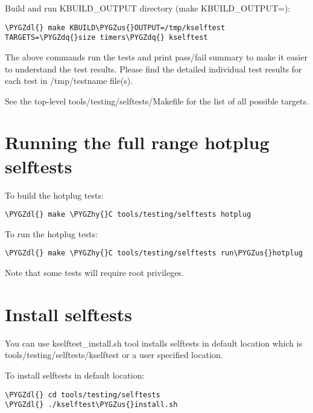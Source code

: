 \documentclass[a4paper,8pt,english]{sphinxmanual}
\def\PYGZus{\char`\_}
\def\PYGZdl{\char`\$}
\def\PYGZhy{\char`\-}
\def\PYGZdq{\char`\"}
\begin{document}
Build and run KBUILD\_OUTPUT directory (make KBUILD\_OUTPUT=):

\begin{Verbatim}[commandchars=\\\{\}]
\PYGZdl{} make KBUILD\PYGZus{}OUTPUT=/tmp/kselftest TARGETS=\PYGZdq{}size timers\PYGZdq{} kselftest
\end{Verbatim}

The above commands run the tests and print pass/fail summary to make it
easier to understand the test results. Please find the detailed individual
test results for each test in /tmp/testname file(s).

See the top-level tools/testing/selftests/Makefile for the list of all
possible targets.


\section{Running the full range hotplug selftests}
\label{dev-tools/kselftest:running-the-full-range-hotplug-selftests}
To build the hotplug tests:

\begin{Verbatim}[commandchars=\\\{\}]
\PYGZdl{} make \PYGZhy{}C tools/testing/selftests hotplug
\end{Verbatim}

To run the hotplug tests:

\begin{Verbatim}[commandchars=\\\{\}]
\PYGZdl{} make \PYGZhy{}C tools/testing/selftests run\PYGZus{}hotplug
\end{Verbatim}

Note that some tests will require root privileges.


\section{Install selftests}
\label{dev-tools/kselftest:install-selftests}
You can use kselftest\_install.sh tool installs selftests in default
location which is tools/testing/selftests/kselftest or a user specified
location.

To install selftests in default location:

\begin{Verbatim}[commandchars=\\\{\}]
\PYGZdl{} cd tools/testing/selftests
\PYGZdl{} ./kselftest\PYGZus{}install.sh
\end{Verbatim}
\end{document}
